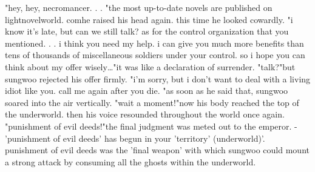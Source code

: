 "hey, hey, necromancer.
.
.
"the most up-to-date novels are published on lightnovelworld.
comhe raised his head again.
 this time he looked cowardly.
 "i know it's late, but can we still talk? as for the control organization that you mentioned.
.
.
i think you need my help.
 i can give you much more benefits than tens of thousands of miscellaneous soldiers under your control.
 so i hope you can think about my offer wisely…"it was like a declaration of surrender.
"talk?"but sungwoo rejected his offer firmly.
"i'm sorry, but i don't want to deal with a living idiot like you.
 call me again after you die.
"as soon as he said that, sungwoo soared into the air vertically.
"wait a moment!"now his body reached the top of the underworld.
 then his voice resounded throughout the world once again.
"punishment of evil deeds!"the final judgment was meted out to the emperor.
 - 'punishment of evil deeds' has begun in your 'territory' (underworld)'.
punishment of evil deeds was the 'final weapon' with which sungwoo could mount a strong attack by consuming all the ghosts within the underworld.

